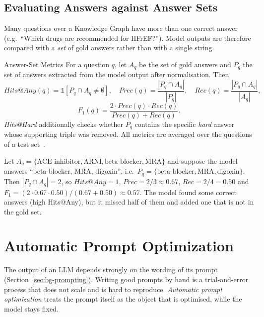 \subsection{Evaluating Answers against Answer Sets}
\label{sec:bg-metrics}

Many questions over a Knowledge Graph have more than one correct answer
(e.g.\ ``Which drugs are recommended for HFrEF?''). Model outputs are
therefore compared with a \emph{set} of gold answers rather than with a single
string.

\begin{bgdefinition}{Answer-Set Metrics}
For a question $q$, let $A_q$ be the set of gold answers and $P_q$ the set
of answers extracted from the model output after normalisation. Then
\[
  \mathit{Hits@Any}(q) = \mathbb{1}\left[P_q \cap A_q \neq \emptyset\right], \quad
  \mathit{Prec}(q) = \frac{|P_q \cap A_q|}{|P_q|}, \quad
  \mathit{Rec}(q) = \frac{|P_q \cap A_q|}{|A_q|},
\]
\[
  F_1(q) = \frac{2\cdot \mathit{Prec}(q)\cdot \mathit{Rec}(q)}{\mathit{Prec}(q)+\mathit{Rec}(q)} .
\]
\emph{Hits@Hard} additionally checks whether $P_q$ contains the specific
\emph{hard} answer whose supporting triple was removed. All metrics are
averaged over the questions of a test set~\cite{zhou2026breaks}.
\end{bgdefinition}

\begin{bgexample}
Let $A_q = \{\text{ACE inhibitor}, \text{ARNI}, \text{beta-blocker}, \text{MRA}\}$
and suppose the model answers ``beta-blocker, MRA, digoxin'', i.e.\
$P_q = \{\text{beta-blocker}, \text{MRA}, \text{digoxin}\}$. Then
$|P_q \cap A_q| = 2$, so $\mathit{Hits@Any}=1$,
$\mathit{Prec} = 2/3 \approx 0.67$, $\mathit{Rec} = 2/4 = 0.50$ and
$F_1 = (2 \cdot 0.67 \cdot 0.50)/(0.67+0.50) \approx 0.57$. The model found
some correct answers (high Hits@Any), but it missed half of them and added
one that is not in the gold set.
\end{bgexample}

\section{Automatic Prompt Optimization}
\label{sec:bg-apo}

The output of an LLM depends strongly on the wording of its prompt
(Section~\ref{sec:bg-prompting}). Writing good prompts by hand is a
trial-and-error process that does not scale and is hard to reproduce.
\emph{Automatic prompt optimization} treats the prompt itself as the object
that is optimised, while the model stays fixed.

